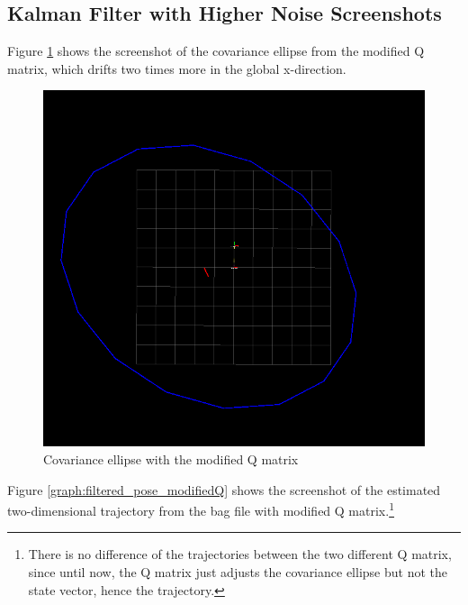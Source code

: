 \documentclass[14pt,a4paper]{article}
\begin{document}
	\subsection{Kalman Filter with Higher Noise Screenshots}
	
		Figure \ref{graph:Q_2Times} shows the screenshot of the covariance ellipse from the modified Q matrix, which drifts two times more in the global x-direction.\\
	
	\begin{figure}[htbp]
	\includegraphics[scale=0.5]{Q_x_2Times.png}
  	\caption{Covariance ellipse with the modified Q matrix}
    \label{graph:Q_2Times}
	\end{figure}
	
		Figure \ref{graph:filtered_pose_modifiedQ} shows the screenshot of the estimated two-dimensional trajectory from the bag file with modified Q matrix.\footnote{There is no difference of the trajectories between the two different Q matrix, since until now, the Q matrix just adjusts the covariance ellipse but not the state vector, hence the trajectory.}
	
\end{document}
